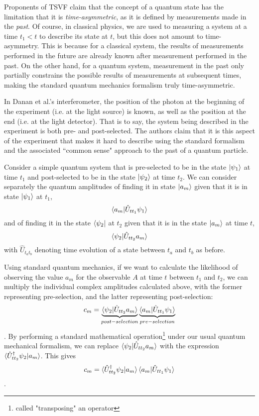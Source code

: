 \documentclass{article}
\begin{document}
Proponents of TSVF claim that the concept of a quantum state has the limitation 
that it is \textit{time-asymmetric}, as it is defined by measurements made in 
the \textit{past}\cite{aharonov,danan,past}. Of course, in classical physics, 
we are used to measuring a system at a time $t_1 < t$ to describe its state at 
$t$, but this does not amount to time-asymmetry. This is because for a 
classical system, the results of measurements performed in the future are 
already known after measurement performed in the past\cite{aharonov2008}. On 
the other hand, for a quantum system, measurement in the past only partially 
constrains the possible results of measurements at subsequent times, making the 
standard quantum mechanics formalism truly time-asymmetric. 

In Danan et al.'s interferometer, the position of the photon at the beginning 
of the experiment (i.e. at the light source) is known, as well as the position 
at the end (i.e.  at the light detector). That is to say, the system being 
described in the experiment is both pre- and post-selected. The authors claim 
that it is this aspect of the experiment that makes it hard to describe using 
the standard formalism and the associated ``common sense" approach to the past 
of a quantum particle.

Consider a simple quantum system that is pre-selected to be in the state
$\ket{\psi_1}$ at time $t_1$ and post-selected to be in the state 
$\ket{\psi_2}$ at time $t_2$. We can consider separately the quantum amplitudes 
of finding it in state $\ket{a_m}$ given that it is in state $\ket{\psi_1}$ at 
$t_1$, $$\braket{a_m|\hat U_{t t_1} \psi_1}$$ and of finding it in the state 
$\bra{\psi_2}$ at $t_2$ given that it is in the state $\ket{a_m}$ at time $t$, 
$$\braket{\psi_2|\hat U_{t t_2} a_m}$$ with $\hat U_{t_a t_b}$ denoting time 
evolution of a state between $t_a$ and $t_b$ as before\cite{aharonov2008}.

Using standard quantum mechanics, if we want to calculate the likelihood of 
observing the value $a_m$ for the observable $A$ at time $t$ between $t_1$ and 
$t_2$, we can multiply the individual complex amplitudes calculated above, with 
the former representing pre-selection, and the latter representing 
post-selection: $$c_m = \underbrace{\braket{\psi_2|\hat U_{t t_2} 
a_m}}_{post-selection} \underbrace{\braket{a_m|\hat U_{t t_1} 
\psi_1}}_{pre-selection}$$\cite{aharonov2008}. By performing a standard 
mathematical operation\footnote{called "transposing" an operator} under our 
usual quantum mechanical formalism, we can replace $\braket{\psi_2|\hat U_{t 
t_2} a_m}$ with the expression $\braket{\hat U_{t t_2}^{\dagger}\psi_2|a_m}$.  
This gives $$c_m = \braket{\hat U_{t t_2}^\dagger\psi_2| a_m} \braket{a_m|\hat 
U_{t t_1} \psi_1}$$. 
\end{document}
